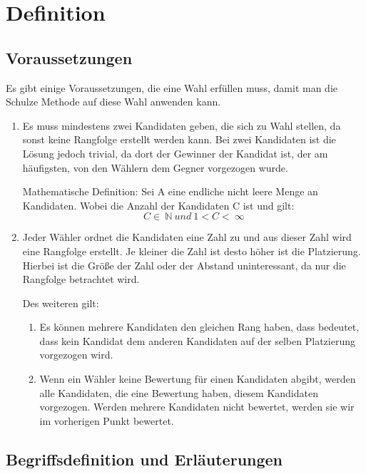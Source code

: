 \section{Definition}
\label{sec:definition}


\subsection{Voraussetzungen} 
\label{sec:voraussetzungen}
Es gibt einige Voraussetzungen, die eine Wahl erfüllen muss, damit man die Schulze Methode auf diese Wahl anwenden kann.

\begin{enumerate}
\item Es muss mindestens zwei Kandidaten geben, die sich zu Wahl stellen, da sonst keine Rangfolge erstellt werden kann. Bei zwei Kandidaten ist die Lösung jedoch trivial, da dort der Gewinner der Kandidat ist, der am häufigsten, von den Wählern dem Gegner vorgezogen wurde.

Mathematische Definition:
Sei A eine endliche nicht leere Menge an Kandidaten. Wobei die Anzahl der Kandidaten C ist und gilt: 
\[
  C \in\ \mathbb{N}\  und \ 1 < C <\ \infty
\]

\item Jeder Wähler ordnet die Kandidaten eine Zahl zu und aus dieser Zahl wird eine Rangfolge erstellt. Je kleiner die Zahl ist desto höher ist die Platzierung. Hierbei ist die Größe der Zahl oder der Abstand uninteressant, da nur die Rangfolge betrachtet wird.

Des weiteren gilt:
\begin{enumerate}
\item \label{itm:Regel1} Es können mehrere Kandidaten den gleichen Rang haben, dass bedeutet, dass kein Kandidat dem anderen Kandidaten auf der selben Platzierung vorgezogen wird. 
\item Wenn ein Wähler keine Bewertung für einen Kandidaten abgibt, werden alle Kandidaten, die eine Bewertung haben, diesem Kandidaten vorgezogen. Werden mehrere Kandidaten nicht bewertet, werden sie wir im vorherigen Punkt bewertet.
\end{enumerate}
\end{enumerate}

\subsection{Begriffsdefinition und Erläuterungen } 
\label{sec:begriffsdefinition}

